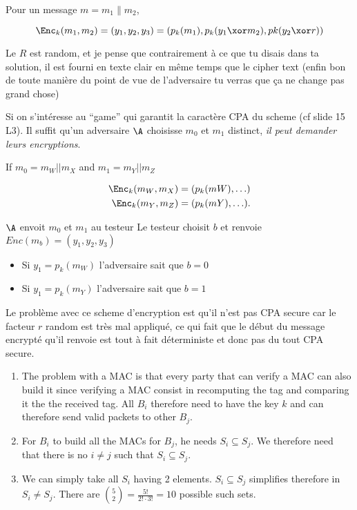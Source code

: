 \begin{solution}
	Pour un message $m = m_1 \| m_2$,
	
	\[ \Enc_k(m_1, m_2) = (y_1, y_2, y_3)  =(p_k(m_1) , p_k(y_1 \xor m_2), pk(y_2 \xor r)) \]
	
	Le $R$ est random, et je pense que contrairement à ce que tu disais dans ta
	solution, il est fourni en texte clair en même temps que le cipher text
	(enfin bon de toute manière du point de vue de l'adversaire tu verras que
	ça ne change pas grand chose)
	
	Si on s'intéresse au ``game'' qui garantit la caractère CPA du scheme (cf slide 15 L3).
	Il suffit qu'un adversaire $\A$ choisisse $m_0$ et $m_1$ distinct, \emph{il peut demander
		leurs encryptions}.
	
	If $m_0 = m_W || m_X$ and $m_1 = m_Y || m_Z$
	
	\begin{align*}
		\Enc_k(m_W,m_X) = (p_k(mW), \ldots)\\
		\Enc_k(m_Y,m_Z) = (p_k(mY), \ldots).
	\end{align*}
	
	$\A$ envoit $m_0$ et $m_1$ au testeur
	Le testeur choisit $b$ et renvoie $Enc(m_b) = (y_1 ,y_2, y_3)$
	
	\begin{itemize}
		\item Si $y_1 = p_k(m_W)$ l'adversaire sait que $b = 0$
		\item Si $y_1 = p_k(m_Y)$ l'adversaire sait que $b = 1$
	\end{itemize}
	
	Le problème avec ce scheme d'encryption est qu'il n'est pas CPA secure car
	le facteur $r$ random est très mal appliqué, ce qui fait que le début du
	message encrypté qu'il renvoie est tout à fait déterministe et donc pas du
	tout CPA secure.
\end{solution}

\begin{solution}
	\begin{enumerate}
		\item
		The problem with a MAC is that every party that can verify a MAC can also build it since verifying a MAC consist
		in recomputing the tag and comparing it the the received tag.
		All $B_i$ therefore need to have the key $k$ and can therefore send valid packets to other $B_j$.
		\item
		For $B_i$ to build all the MACs for $B_j$, he needs $S_i \subseteq S_j$.
		We therefore need that there is no $i \neq j$ such that $S_i \subseteq S_j$.
		\item We can simply take all $S_i$ having 2 elements.
		$S_i \subseteq S_j$ simplifies therefore in $S_i \neq S_j$.
		There are ${5 \choose 2} = \frac{5!}{2! \cdot 3!} = 10$ possible such sets.
	\end{enumerate}
\end{solution}

